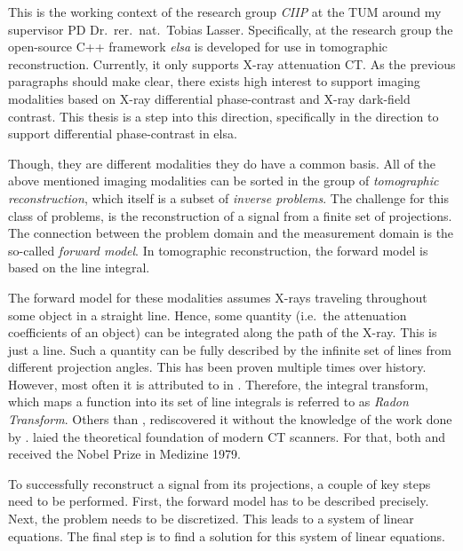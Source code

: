 This is the working context of the research group \textit{\gls{CIIP}} at the \gls{TUM} around my
supervisor PD Dr.\ rer.\ nat.\ Tobias Lasser. Specifically, at the research group the open-source
C++ framework \textit{elsa} is developed for use in tomographic reconstruction. Currently, it only
supports X-ray attenuation CT\@. As the previous paragraphs should make clear, there exists high
interest to support imaging modalities based on X-ray differential phase-contrast and X-ray
dark-field contrast. This thesis is a step into this direction, specifically in the direction to
support differential phase-contrast in elsa.

Though, they are different modalities they do have a common basis. All of the above mentioned
imaging modalities can be sorted in the group of \textit{tomographic reconstruction}, which itself
is a subset of \textit{inverse problems}. The challenge for this class of problems, is the
reconstruction of a signal from a finite set of projections. The connection between the problem
domain and the measurement domain is the so-called \textit{forward model}. In tomographic
reconstruction, the forward model is based on the line integral.

The forward model for these modalities assumes X-rays traveling throughout some object in a straight
line. Hence, some quantity (i.e.\ the attenuation coefficients of an object) can be integrated along
the path of the X-ray. This is just a line. Such a quantity can be fully described by the infinite
set of lines from different projection angles. This has been proven multiple times over history.
However, most often it is attributed to \citeauthor*{radon_uber_1917} in \citeyear{radon_uber_1917}.
Therefore, the integral transform, which maps a function into its set of line integrals is referred
to as \textit{Radon Transform}. Others than \citeauthor*{radon_uber_1917},
\citeauthor*{cormack_representation_1963} rediscovered it without the knowledge of the work done by
\citeauthor*{radon_uber_1917}. \citeauthor*{cormack_representation_1963} laied the theoretical
foundation of modern CT scanners. For that, both \citeauthor*{cormack_representation_1963} and
\citeauthor*{hounsfield_computerized_1973} received the Nobel Prize in Medizine 1979.

To successfully reconstruct a signal from its projections, a couple of key steps need to be
performed. First, the forward model has to be described precisely. Next, the problem needs to be
discretized. This leads to a system of linear equations. The final step is to find a solution for
this system of linear equations.

